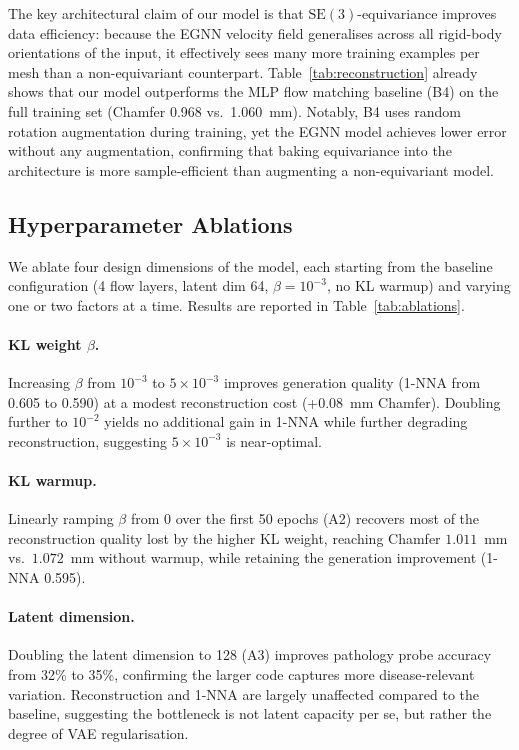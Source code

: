 \documentclass{article}
\newcommand{\SE}{\mathrm{SE}(3)}
\begin{document}
The key architectural claim of our model is that $\SE$-equivariance
improves data efficiency: because the EGNN velocity field generalises
across all rigid-body orientations of the input, it effectively sees
many more training examples per mesh than a non-equivariant counterpart.
Table~\ref{tab:reconstruction} already shows that our model outperforms
the MLP flow matching baseline (B4) on the full training set
(Chamfer 0.968 vs.\ 1.060~mm).
Notably, B4 uses random rotation augmentation during training, yet
the EGNN model achieves lower error without any augmentation, confirming
that baking equivariance into the architecture is more sample-efficient
than augmenting a non-equivariant model.

\subsection{Hyperparameter Ablations}
\label{sec:ablations}

We ablate four design dimensions of the model, each starting from the
baseline configuration (4 flow layers, latent dim 64, $\beta = 10^{-3}$,
no KL warmup) and varying one or two factors at a time.
Results are reported in Table~\ref{tab:ablations}.

\paragraph{KL weight $\beta$.}
Increasing $\beta$ from $10^{-3}$ to $5 \times 10^{-3}$ improves generation
quality (1-NNA from 0.605 to 0.590) at a modest reconstruction cost
(+0.08~mm Chamfer). Doubling further to $10^{-2}$ yields no additional
gain in 1-NNA while further degrading reconstruction, suggesting $5 \times
10^{-3}$ is near-optimal.

\paragraph{KL warmup.}
Linearly ramping $\beta$ from 0 over the first 50 epochs (A2) recovers
most of the reconstruction quality lost by the higher KL weight, reaching
Chamfer $1.011$~mm vs.\ $1.072$~mm without warmup, while retaining the
generation improvement (1-NNA 0.595).

\paragraph{Latent dimension.}
Doubling the latent dimension to 128 (A3) improves pathology probe accuracy
from 32\% to 35\%, confirming the larger code captures more disease-relevant
variation. Reconstruction and 1-NNA are largely unaffected compared to the
baseline, suggesting the bottleneck is not latent capacity per se, but
rather the degree of VAE regularisation.
\end{document}
